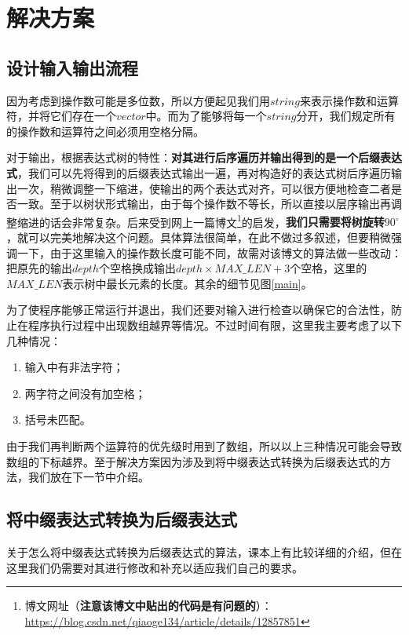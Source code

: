 \documentclass[UTF8]{ctexart}
\begin{document}
	
	\section{解决方案}
		\subsection{设计输入输出流程}\label{input and output}
		\indent 因为考虑到操作数可能是多位数，所以方便起见我们用$string$来表示操作数和运算符，并将它们存在一个$vector$中。而为了能够将每一个$string$分开，我们规定所有的操作数和运算符之间必须用空格分隔。
		
		\indent 对于输出，根据表达式树的特性：\textbf{对其进行后序遍历并输出得到的是一个后缀表达式}，我们可以先将得到的后缀表达式输出一遍，再对构造好的表达式树后序遍历输出一次，稍微调整一下缩进，使输出的两个表达式对齐，可以很方便地检查二者是否一致。至于以树状形式输出，由于每个操作数不等长，所以直接以层序输出再调整缩进的话会非常复杂。后来受到网上一篇博文\footnote{博文网址（\textbf{注意该博文中贴出的代码是有问题的}）：\url{https://blog.csdn.net/qiaoge134/article/details/12857851}}的启发，\textbf{我们只需要将树旋转$90^{\circ}$}，就可以完美地解决这个问题。具体算法很简单，在此不做过多叙述，但要稍微强调一下，由于这里输入的操作数长度可能不同，故需对该博文的算法做一些改动：把原先的输出$depth$个空格换成输出$depth \times MAX\_LEN + 3$个空格，这里的$MAX\_LEN$表示树中最长元素的长度。其余的细节见图\ref{main}。
		
		\indent 为了使程序能够正常运行并退出，我们还要对输入进行检查以确保它的合法性，防止在程序执行过程中出现数组越界等情况。不过时间有限，这里我主要考虑了以下几种情况：
		\begin{enumerate}
			\item 输入中有非法字符；
			\item 两字符之间没有加空格；
			\item 括号未匹配。
		\end{enumerate}
	
		\indent 由于我们再判断两个运算符的优先级时用到了数组，所以以上三种情况可能会导致数组的下标越界。至于解决方案因为涉及到将中缀表达式转换为后缀表达式的方法，我们放在下一节中介绍。
	
		\subsection{将中缀表达式转换为后缀表达式}\label{fun to RPN}
		
		\indent 关于怎么将中缀表达式转换为后缀表达式的算法，课本\cite{data_structure}上有比较详细的介绍，但在这里我们仍需要对其进行修改和补充以适应我们自己的要求。
		
\end{document}

